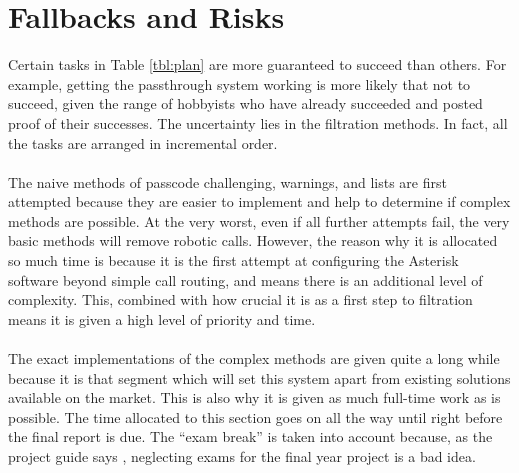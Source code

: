 \documentclass[main.tex]{subfiles}
\begin{document}
\section{Fallbacks and Risks}
Certain tasks in Table \ref{tbl:plan} are more guaranteed to succeed than others. For example, getting the passthrough system working is more likely that not to succeed, given the range of hobbyists who have already succeeded and posted proof of their successes. The uncertainty lies in the filtration methods. In fact, all the tasks are arranged in incremental order.
\\\\
The naive methods of passcode challenging, warnings, and lists are first attempted because they are easier to implement and help to determine if complex methods are possible. At the very worst, even if all further attempts fail, the very basic methods will remove robotic calls. However, the reason why it is allocated so much time is because it is the first attempt at configuring the Asterisk software beyond simple call routing, and means there is an additional level of complexity. This, combined with how crucial it is as a first step to filtration means it is given a high level of priority and time.
\\\\
The exact implementations of the complex methods are given quite a long while because it is that segment which will set this system apart from existing solutions available on the market. This is also why it is given as much full-time work as is possible. The time allocated to this section goes on all the way until right before the final report is due. The ``exam break'' is taken into account because, as the project guide says \cite{guide}, neglecting exams for the final year project is a bad idea.
\\\\
\end{document}
